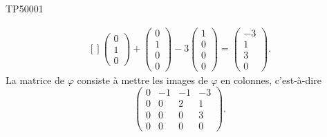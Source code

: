 \begin{corrige}{TP50001}
\begin{enumerate}
\begin{equation}
\begin{aligned}[]
\begin{pmatrix}
						0	\\ 
						1	\\ 
						0	
					\end{pmatrix}+\begin{pmatrix}
						0	\\ 
						1	\\ 
						0	\\ 
						0	
					\end{pmatrix}-3\begin{pmatrix}
						1	\\ 
						0	\\ 
						0	\\ 
						0	
					\end{pmatrix}=\begin{pmatrix}
						-3	\\ 
						1	\\ 
						3	\\ 
						0	
					\end{pmatrix}.
				\end{aligned}
			\end{equation}
			La matrice de $\varphi$ consiste à mettre les images de $\varphi$ en colonnes, c'est-à-dire
			\begin{equation}
				\begin{pmatrix}
					 0	&	-1	&	-1	&	-3	\\
					 0	&	0	&	2	&	1	\\
					 0	&	0	&	0	&	3	\\ 
					 0	&	0	&	0	&	0	 
					  \end{pmatrix}.
			\end{equation}
			

	\end{enumerate}

\end{corrige}
